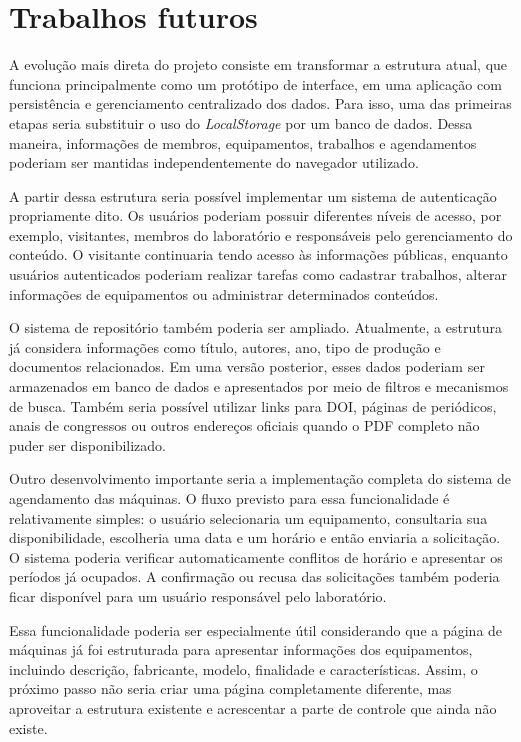 \vspace{5mm}
\section{Trabalhos futuros}

A evolução mais direta do projeto consiste em transformar a estrutura atual, que funciona principalmente como um protótipo de interface, em uma aplicação com persistência e gerenciamento centralizado dos dados. Para isso, uma das primeiras etapas seria substituir o uso do \textit{LocalStorage} por um banco de dados. Dessa maneira, informações de membros, equipamentos, trabalhos e agendamentos poderiam ser mantidas independentemente do navegador utilizado.

A partir dessa estrutura seria possível implementar um sistema de autenticação propriamente dito. Os usuários poderiam possuir diferentes níveis de acesso, por exemplo, visitantes, membros do laboratório e responsáveis pelo gerenciamento do conteúdo. O visitante continuaria tendo acesso às informações públicas, enquanto usuários autenticados poderiam realizar tarefas como cadastrar trabalhos, alterar informações de equipamentos ou administrar determinados conteúdos.

O sistema de repositório também poderia ser ampliado. Atualmente, a estrutura já considera informações como título, autores, ano, tipo de produção e documentos relacionados. Em uma versão posterior, esses dados poderiam ser armazenados em banco de dados e apresentados por meio de filtros e mecanismos de busca. Também seria possível utilizar links para DOI, páginas de periódicos, anais de congressos ou outros endereços oficiais quando o PDF completo não puder ser disponibilizado.

Outro desenvolvimento importante seria a implementação completa do sistema de agendamento das máquinas. O fluxo previsto para essa funcionalidade é relativamente simples: o usuário selecionaria um equipamento, consultaria sua disponibilidade, escolheria uma data e um horário e então enviaria a solicitação. O sistema poderia verificar automaticamente conflitos de horário e apresentar os períodos já ocupados. A confirmação ou recusa das solicitações também poderia ficar disponível para um usuário responsável pelo laboratório.

Essa funcionalidade poderia ser especialmente útil considerando que a página de máquinas já foi estruturada para apresentar informações dos equipamentos, incluindo descrição, fabricante, modelo, finalidade e características. Assim, o próximo passo não seria criar uma página completamente diferente, mas aproveitar a estrutura existente e acrescentar a parte de controle que ainda não existe.

